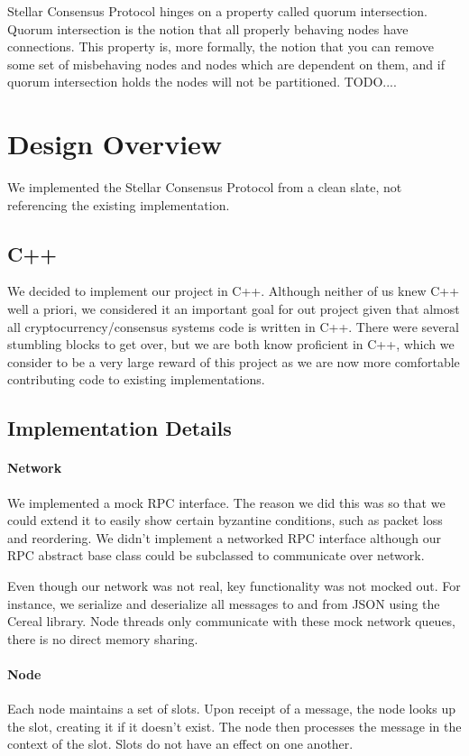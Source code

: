 \documentclass[preprint,11pt]{article} \usepackage{amsmath}
\begin{document}
Stellar Consensus Protocol hinges on a property called quorum
intersection.  Quorum intersection is the notion that all properly
behaving nodes have connections.  This property is, more formally, the
notion that you can remove some set of misbehaving nodes and nodes
which are dependent on them, and if quorum intersection holds the
nodes will not be partitioned. TODO....



\section{Design Overview}
We implemented the Stellar Consensus Protocol from a clean slate, not
referencing the existing implementation.
\subsection{C++}
We decided to implement our project in C++. Although neither of us
knew C++ well a priori, we considered it an important goal for out
project given that almost all cryptocurrency/consensus systems code is
written in C++. There were several stumbling blocks to get over, but
we are both know proficient in C++, which we consider to be a very
large reward of this project as we are now more comfortable
contributing code to existing implementations.
\subsection{Implementation Details}
\paragraph{Network}
We implemented a mock RPC interface. The reason we did this was so
that we could extend it to easily show certain byzantine conditions,
such as packet loss and reordering. We didn't implement a networked
RPC interface although our RPC abstract base class could be subclassed
to communicate over network.

Even though our network was not real, key functionality was not mocked
out.  For instance, we serialize and deserialize all messages to and
from JSON using the Cereal library. Node threads only communicate with
these mock network queues, there is no direct memory sharing.

\paragraph{Node}
Each node maintains a set of slots. Upon receipt of a message, the
node looks up the slot, creating it if it doesn't exist.  The node
then processes the message in the context of the slot. Slots do not
have an effect on one another.
\end{document}
